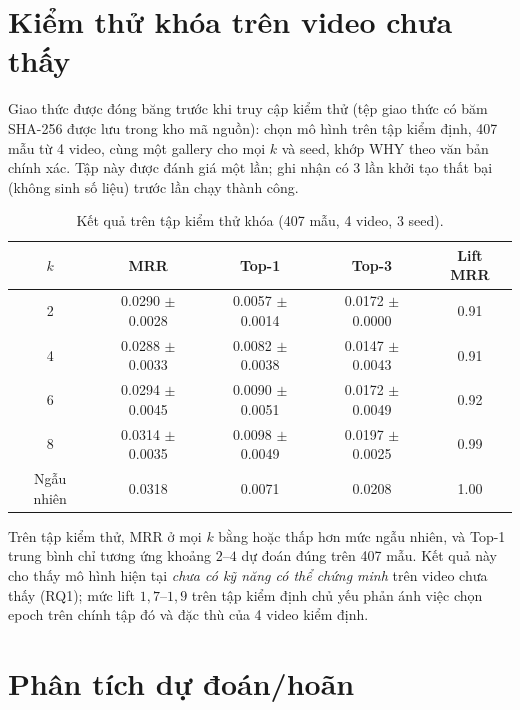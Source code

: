 \documentclass[12pt,a4paper]{report}
\begin{document}
\section{Kiểm thử khóa trên video chưa thấy}
\label{sec:locked_test}

Giao thức được đóng băng trước khi truy cập kiểm thử (tệp giao thức có băm SHA-256 được lưu trong kho mã nguồn): chọn mô hình trên tập kiểm định, 407 mẫu từ 4 video, cùng một gallery cho mọi $k$ và seed, khớp WHY theo văn bản chính xác. Tập này được đánh giá một lần; ghi nhận có 3 lần khởi tạo thất bại (không sinh số liệu) trước lần chạy thành công.

\begin{table}[ht]
    \centering
    \small
    \caption{Kết quả trên tập kiểm thử khóa (407 mẫu, 4 video, 3 seed).}
    \label{tab:locked_test}
    \begin{tabular}{ccccc}
        \toprule
        \textbf{$k$} & \textbf{MRR} & \textbf{Top-1} & \textbf{Top-3} & \textbf{Lift MRR} \\
        \midrule
        2 & 0.0290 $\pm$ 0.0028 & 0.0057 $\pm$ 0.0014 & 0.0172 $\pm$ 0.0000 & 0.91 \\
        4 & 0.0288 $\pm$ 0.0033 & 0.0082 $\pm$ 0.0038 & 0.0147 $\pm$ 0.0043 & 0.91 \\
        6 & 0.0294 $\pm$ 0.0045 & 0.0090 $\pm$ 0.0051 & 0.0172 $\pm$ 0.0049 & 0.92 \\
        8 & 0.0314 $\pm$ 0.0035 & 0.0098 $\pm$ 0.0049 & 0.0197 $\pm$ 0.0025 & 0.99 \\
        \midrule
        Ngẫu nhiên & 0.0318 & 0.0071 & 0.0208 & 1.00 \\
        \bottomrule
    \end{tabular}
\end{table}

Trên tập kiểm thử, MRR ở mọi $k$ bằng hoặc thấp hơn mức ngẫu nhiên, và Top-1 trung bình chỉ tương ứng khoảng $2$--$4$ dự đoán đúng trên 407 mẫu. Kết quả này cho thấy mô hình hiện tại \emph{chưa có kỹ năng có thể chứng minh} trên video chưa thấy (RQ1); mức lift $1{,}7$--$1{,}9$ trên tập kiểm định chủ yếu phản ánh việc chọn epoch trên chính tập đó và đặc thù của 4 video kiểm định.

\section{Phân tích dự đoán/hoãn}
\label{sec:selective}
\end{document}
